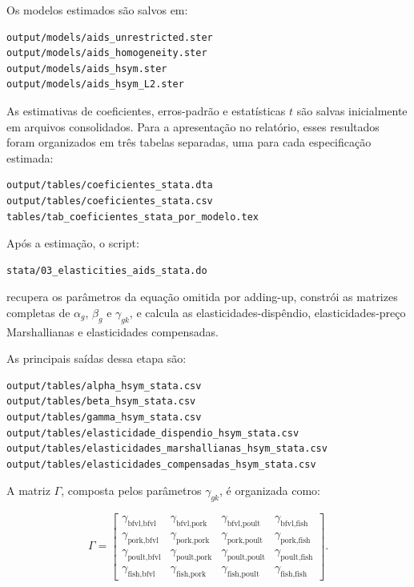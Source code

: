 \documentclass[12pt,a4paper]{article}
\begin{document}
Os modelos estimados são salvos em:

\begin{verbatim}
output/models/aids_unrestricted.ster
output/models/aids_homogeneity.ster
output/models/aids_hsym.ster
output/models/aids_hsym_L2.ster
\end{verbatim}

As estimativas de coeficientes, erros-padrão e estatísticas \(t\) são salvas inicialmente em arquivos consolidados. Para a apresentação no relatório, esses resultados foram organizados em três tabelas separadas, uma para cada especificação estimada:

\begin{verbatim}
output/tables/coeficientes_stata.dta
output/tables/coeficientes_stata.csv
tables/tab_coeficientes_stata_por_modelo.tex
\end{verbatim}

Após a estimação, o script:

\begin{verbatim}
stata/03_elasticities_aids_stata.do
\end{verbatim}

recupera os parâmetros da equação omitida por adding-up, constrói as matrizes completas de \(\alpha_g\), \(\beta_g\) e \(\gamma_{gk}\), e calcula as elasticidades-dispêndio, elasticidades-preço Marshallianas e elasticidades compensadas.

As principais saídas dessa etapa são:

\begin{verbatim}
output/tables/alpha_hsym_stata.csv
output/tables/beta_hsym_stata.csv
output/tables/gamma_hsym_stata.csv
output/tables/elasticidade_dispendio_hsym_stata.csv
output/tables/elasticidades_marshallianas_hsym_stata.csv
output/tables/elasticidades_compensadas_hsym_stata.csv
\end{verbatim}

A matriz \(\Gamma\), composta pelos parâmetros \(\gamma_{gk}\), é organizada como:

\[
\Gamma
=
\begin{bmatrix}
\gamma_{\text{bfvl},\text{bfvl}} &
\gamma_{\text{bfvl},\text{pork}} &
\gamma_{\text{bfvl},\text{poult}} &
\gamma_{\text{bfvl},\text{fish}} \\

\gamma_{\text{pork},\text{bfvl}} &
\gamma_{\text{pork},\text{pork}} &
\gamma_{\text{pork},\text{poult}} &
\gamma_{\text{pork},\text{fish}} \\

\gamma_{\text{poult},\text{bfvl}} &
\gamma_{\text{poult},\text{pork}} &
\gamma_{\text{poult},\text{poult}} &
\gamma_{\text{poult},\text{fish}} \\

\gamma_{\text{fish},\text{bfvl}} &
\gamma_{\text{fish},\text{pork}} &
\gamma_{\text{fish},\text{poult}} &
\gamma_{\text{fish},\text{fish}}
\end{bmatrix}.
\tag{44}
\label{eq:matriz_gamma}
\]
\end{document}
